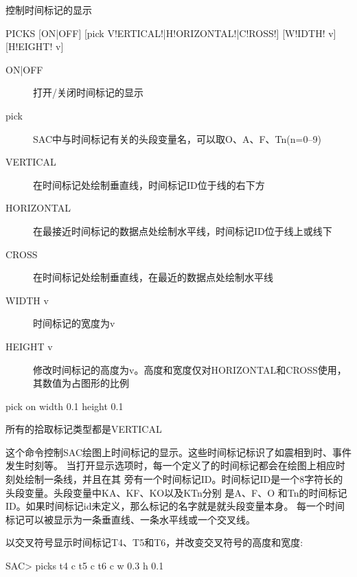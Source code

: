 \label{cmd:picks}

控制时间标记的显示

\begin{SACSTX}
PICKS [ON|OFF] [pick V!ERTICAL!|H!ORIZONTAL!|C!ROSS!] [W!IDTH! v] [H!EIGHT! v]
\end{SACSTX}

\begin{description}
\item [ON|OFF] 打开/关闭时间标记的显示
\item [pick] SAC中与时间标记有关的头段变量名，可以取O、A、F、Tn(n=0--9)
\item [VERTICAL] 在时间标记处绘制垂直线，时间标记ID位于线的右下方
\item [HORIZONTAL] 在最接近时间标记的数据点处绘制水平线，时间标记ID位于线上或线下
\item [CROSS] 在时间标记处绘制垂直线，在最近的数据点处绘制水平线
\item [WIDTH v] 时间标记的宽度为v
\item [HEIGHT v] 修改时间标记的高度为v。高度和宽度仅对HORIZONTAL和CROSS使用，其数值为占图形的比例
\end{description}

\begin{SACDFT}
pick on width 0.1 height 0.1
\end{SACDFT}
所有的拾取标记类型都是VERTICAL

这个命令控制SAC绘图上时间标记的显示。这些时间标记标识了如震相到时、事件发生时刻等。
当打开显示选项时，每一个定义了的时间标记都会在绘图上相应时刻处绘制一条线，并且在其
旁有一个时间标记ID。时间标记ID是一个8字符长的头段变量。头段变量中KA、KF、KO以及KTn分别
是A、F、O 和Tn的时间标记ID。如果时间标记id未定义，那么标记的名字就是就头段变量本身。
每一个时间标记可以被显示为一条垂直线、一条水平线或一个交叉线。

以交叉符号显示时间标记T4、T5和T6，并改变交叉符号的高度和宽度:
\begin{SACCode}
SAC> picks t4 c t5 c t6 c w 0.3 h 0.1
\end{SACCode}
